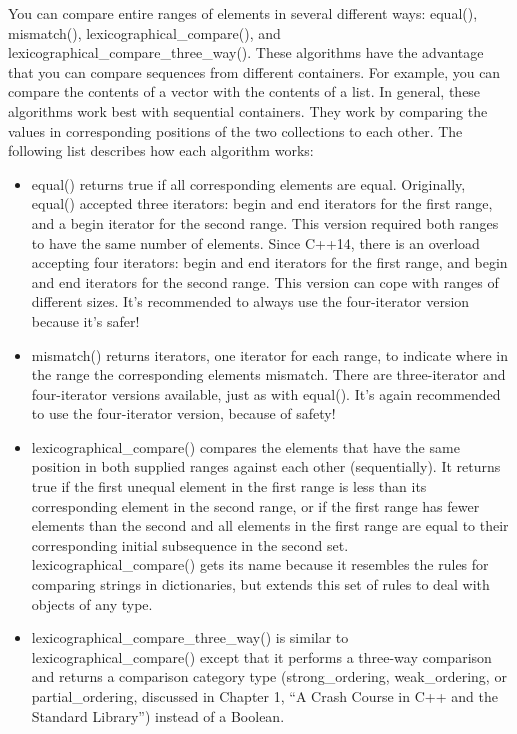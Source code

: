 You can compare entire ranges of elements in several different ways: equal(), mismatch(), lexicographical\_compare(), and lexicographical\_compare\_three\_way(). These algorithms have the advantage that you can compare sequences from different containers. For example, you can compare the contents of a vector with the contents of a list. In general, these algorithms work best with sequential containers. They work by comparing the values in corresponding positions of the two collections to each other. The following list describes how each algorithm works:

\begin{itemize}
\item
equal() returns true if all corresponding elements are equal. Originally, equal() accepted three iterators: begin and end iterators for the first range, and a begin iterator for the second range. This version required both ranges to have the same number of elements. Since C++14, there is an overload accepting four iterators: begin and end iterators for the first range, and begin and end iterators for the second range. This version can cope with ranges of different sizes. It’s recommended to always use the four-iterator version because it’s safer!

\item
mismatch() returns iterators, one iterator for each range, to indicate where in the range the corresponding elements mismatch. There are three-iterator and four-iterator versions available, just as with equal(). It’s again recommended to use the four-iterator version, because of safety!

\item
lexicographical\_compare() compares the elements that have the same position in both supplied ranges against each other (sequentially). It returns true if the first unequal element in the first range is less than its corresponding element in the second range, or if the first range has fewer elements than the second and all elements in the first range are equal to their corresponding initial subsequence in the second set. lexicographical\_compare() gets its name because it resembles the rules for comparing strings in dictionaries, but extends this set of rules to deal with objects of any type.

\item
lexicographical\_compare\_three\_way() is similar to lexicographical\_compare() except that it performs a three-way comparison and returns a comparison category type (strong\_ordering, weak\_ordering, or partial\_ordering, discussed in Chapter 1, “A Crash Course in C++ and the Standard Library”) instead of a Boolean.
\end{itemize}

